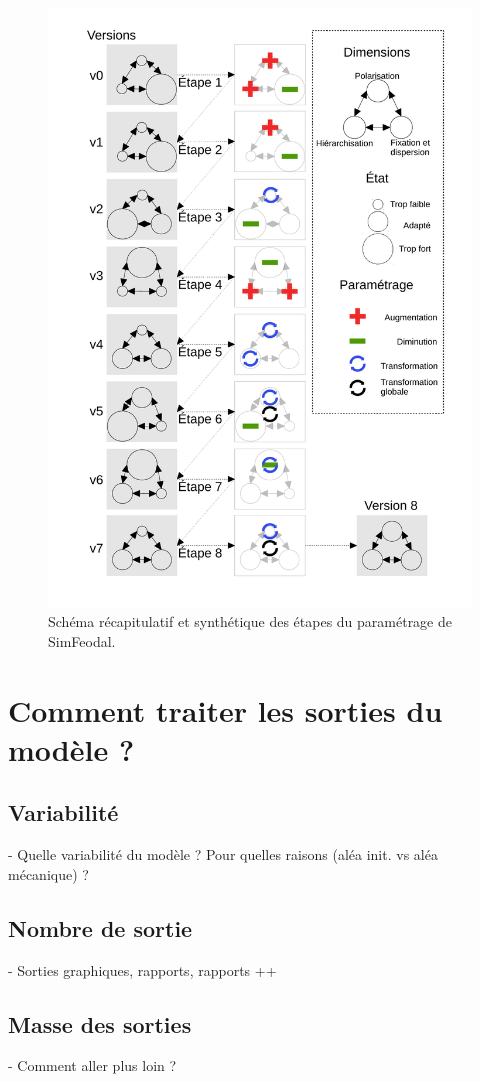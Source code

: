 \documentclass[12pt, a4paper, oneside]{book}
\begin{document}
	\begin{figure}[H]
		\includegraphics[width = \linewidth, page = 1]{img/schema_etapes_complet.pdf}
		\caption{Schéma récapitulatif et synthétique des étapes du paramétrage de SimFeodal.}
		\label{fig:etapes-parametrage-simfeodal}
	\end{figure}
	
	\section{Comment traiter les sorties du modèle ?}
	\subsection{Variabilité}
	- Quelle variabilité du modèle ? Pour quelles raisons (aléa init. vs aléa mécanique) ?
	\subsection{Nombre de sortie}
	- Sorties graphiques, rapports, rapports ++
	\subsection{Masse des sorties}
	- Comment aller plus loin ?
	
	\printbibliography 
	
\end{document}
